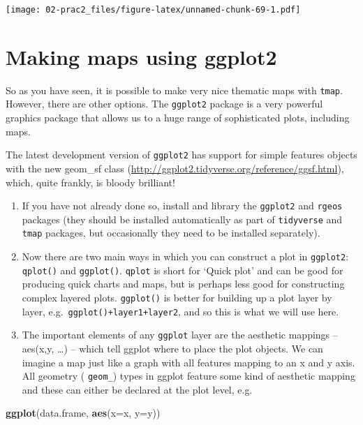 \documentclass[]{book}
\newenvironment{Shaded}{\begin{snugshade}}{\end{snugshade}}
\newcommand{\DataTypeTok}[1]{\textcolor[rgb]{0.13,0.29,0.53}{#1}}
\newcommand{\KeywordTok}[1]{\textcolor[rgb]{0.13,0.29,0.53}{\textbf{#1}}}
\newcommand{\NormalTok}[1]{#1}
\begin{document}
\texttt{[image: 02-prac2\_files/figure-latex/unnamed-chunk-69-1.pdf]}

\hypertarget{making-maps-using-ggplot2}{%
\section{Making maps using ggplot2}\label{making-maps-using-ggplot2}}

So as you have seen, it is possible to make very nice thematic maps with \texttt{tmap}. However, there are other options. The \texttt{ggplot2} package is a very powerful graphics package that allows us to a huge range of sophisticated plots, including maps.

The latest development version of \texttt{ggplot2} has support for simple features objects with the new geom\_sf class (\url{http://ggplot2.tidyverse.org/reference/ggsf.html}), which, quite frankly, is bloody brilliant!

\begin{enumerate}
\def\labelenumi{\arabic{enumi}.}
\setcounter{enumi}{13}
\item
  If you have not already done so, install and library the \texttt{ggplot2} and \texttt{rgeos} packages (they should be installed automatically as part of \texttt{tidyverse} and \texttt{tmap} packages, but occasionally they need to be installed separately).
\item
  Now there are two main ways in which you can construct a plot in \texttt{ggplot2}: \texttt{qplot()} and \texttt{ggplot()}. \texttt{qplot} is short for `Quick plot' and can be good for producing quick charts and maps, but is perhaps less good for constructing complex layered plots. \texttt{ggplot()} is better for building up a plot layer by layer, e.g.~\texttt{ggplot()+layer1+layer2}, and so this is what we will use here.
\item
  The important elements of any \texttt{ggplot} layer are the aesthetic mappings -- aes(x,y, \ldots{}) -- which tell ggplot where to place the plot objects. We can imagine a map just like a graph with all features mapping to an x and y axis. All geometry ( \texttt{geom\_}) types in ggplot feature some kind of aesthetic mapping and these can either be declared at the plot level, e.g.
\end{enumerate}

\begin{Shaded}
\begin{Highlighting}[]
\KeywordTok{ggplot}\NormalTok{(data.frame, }\KeywordTok{aes}\NormalTok{(}\DataTypeTok{x=}\NormalTok{x, }\DataTypeTok{y=}\NormalTok{y))}
\end{Highlighting}
\end{Shaded}
\end{document}
